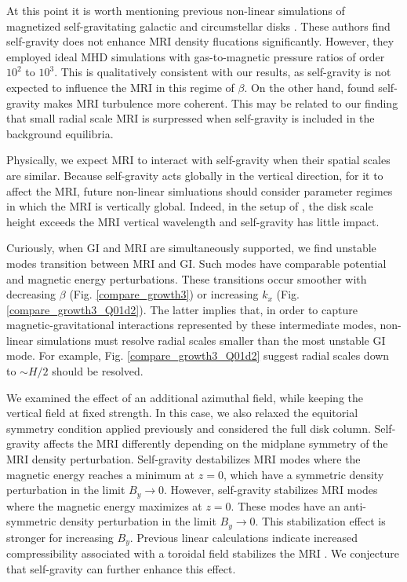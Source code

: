 At this point it is worth mentioning previous non-linear simulations 
of magnetized self-gravitating galactic and circumstellar disks
\citep{kim03,fromang04a,fromang04}. These authors find self-gravity
does not enhance MRI density flucations significantly. However, they
employed ideal MHD simulations with gas-to-magnetic pressure ratios of
order $10^2$ to $10^3$. %
This is qualitatively consistent with our results, as 
self-gravity is not expected to influence the MRI in this 
regime of $\beta$. On the other hand, \cite{fromang04} found
self-gravity makes MRI turbulence more coherent. This may be related
to our finding that small radial scale MRI is surpressed when
self-gravity is included in the background equilibria. 

Physically, we expect MRI to interact with self-gravity when
their spatial scales are similar. Because self-gravity acts globally in the
vertical direction, for it to affect the MRI, future non-linear
simluations should consider parameter regimes in which the MRI is
vertically global. Indeed, in the setup of \cite{kim03}, the disk
scale height exceeds the MRI vertical wavelength and self-gravity has
little impact.   



Curiously, when GI and MRI are simultaneously supported, we find
unstable modes transition between MRI and GI. Such modes
have comparable potential and magnetic energy perturbations. These
transitions occur smoother with decreasing $\beta$
(Fig. \ref{compare_growth3}) or increasing $k_x$
(Fig. \ref{compare_growth3_Q01d2}). The latter implies that, in order
to capture magnetic-gravitational interactions represented by these
intermediate modes, non-linear simulations must resolve radial scales
smaller than the most unstable GI mode. For example, 
Fig. \ref{compare_growth3_Q01d2} suggest radial scales down to $\sim H/2$
should be resolved. 


We examined the effect of an additional azimuthal field, while
keeping the vertical field at fixed strength. In this case, we also
relaxed the equitorial symmetry condition applied previously and
considered the full disk column. Self-gravity affects the MRI
differently depending on the midplane symmetry of the MRI density
perturbation. Self-gravity destabilizes MRI modes where the magnetic
energy reaches a minimum at $z=0$, which have a symmetric
density perturbation in the limit $B_y\to0$. However, 
self-gravity stabilizes MRI modes where the magnetic energy maximizes
at $z=0$. These modes have an anti-symmetric density
perturbation in the limit $B_y\to0$. This stabilization effect is
stronger for increasing $B_y$. Previous linear calculations indicate
increased compressibility associated with a toroidal field stabilizes
the MRI \citep{kim03}. We conjecture that self-gravity can
further enhance this effect.   



